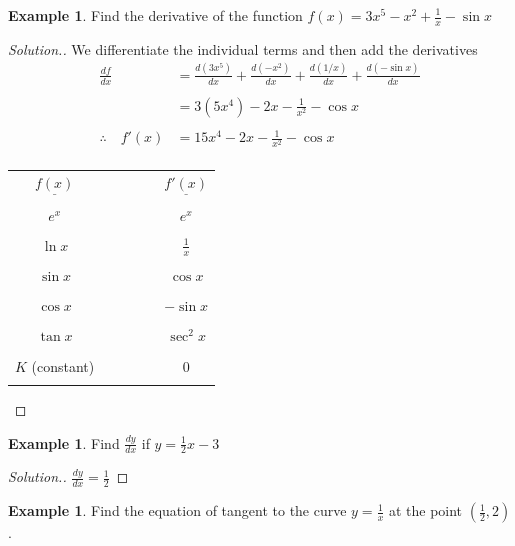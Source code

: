 \documentclass[11pt,a4paper]{article}
\theoremstyle{definition}
\newtheorem{example}[thm]{Example}
\newenvironment{solution}
  {\renewcommand{\qedsymbol}{}\begin{proof}[\textit{Solution}.]}
  {\end{proof}}
\begin{document}
\begin{example}

Find the derivative of the function $f(x)=3x^5-x^2+\frac{1}{x}-\sin x$
\end{example}
\begin{solution}

We differentiate the individual terms and then add the derivatives
\begin{align*}
\frac{df}{dx} & = \frac{d(3x^5)}{dx}+\frac{d(-x^2)}{dx}+\frac{d(1/x)}{dx}+\frac{d(-\sin x)}{dx}\\\\
& = 3 (5x^4)-2x-\frac{1}{x^2}-\cos x\\\\
\therefore \quad  f'(x) & = 15x^4-2x-\frac{1}{x^2}-\cos x\\
\end{align*}



\begin{table}[H]
\centering
\begin{tabular}{cccccc}
$\underline{f(x)}$ &&&&& $\underline{f'(x)}$\\\\
$e^x$ &&&&& $e^x$\\\\
$\ln x$ &&&&& $\frac{1}{x}$\\\\
$\sin x$ &&&&& $\cos x$\\\\
$\cos x$ &&&&& $-\sin x$\\\\
$\tan x$ &&&&& $\sec^2x$\\\\
$K$ (constant) &&&&& 0\\\\
\end{tabular}
\end{table}
\end{solution}
\begin{example}

Find $\frac{dy}{dx}$ if $y=\frac{1}{2}x-3$
\end{example}
\begin{solution}

$\frac{dy}{dx}=\frac{1}{2}$
\end{solution}
\begin{example}

Find the equation of tangent to the curve $y=\frac{1}{x}$ at the point $\left(\frac{1}{2},2\right)$.
\end{example}
\end{document}
